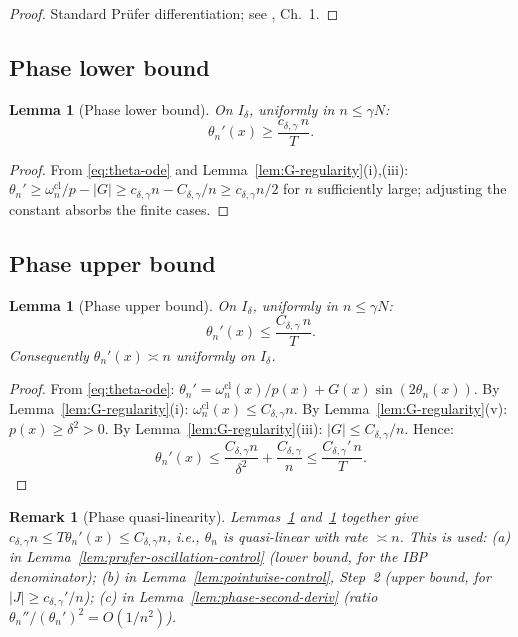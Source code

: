 \documentclass[12pt,a4paper]{amsart}
\newtheorem{lemma}[theorem]{Lemma}
\newtheorem{remark}[theorem]{Remark}
\newcommand{\wncl}{\omega_n^{\mathrm{cl}}}
\begin{document}
\begin{proof}
Standard Pr\"ufer differentiation; see \cite{Levitan}, Ch.~1.
\end{proof}

\subsection{Phase lower bound}

\begin{lemma}[Phase lower bound]\label{lem:phase-lower}
On $I_\delta$, uniformly in $n \le \gamma N$:
\begin{equation}\label{eq:phase-lb}
  \theta_n'(x) \ge \frac{c_{\delta,\gamma}\,n}{T}.
\end{equation}
\end{lemma}

\begin{proof}
From \eqref{eq:theta-ode} and
Lemma~\ref{lem:G-regularity}(i),(iii):
$\theta_n' \ge \wncl/p - |G|
\ge c_{\delta,\gamma}n - C_{\delta,\gamma}/n
\ge c_{\delta,\gamma}n/2$
for $n$ sufficiently large;
adjusting the constant absorbs the finite cases.
\end{proof}

\subsection{Phase upper bound}

\begin{lemma}[Phase upper bound]\label{lem:phase-upper}
On $I_\delta$, uniformly in $n \le \gamma N$:
\begin{equation}\label{eq:phase-ub}
  \theta_n'(x) \le \frac{C_{\delta,\gamma}\,n}{T}.
\end{equation}
Consequently $\theta_n'(x) \asymp n$ uniformly on $I_\delta$.
\end{lemma}

\begin{proof}
From \eqref{eq:theta-ode}:
$\theta_n' = \wncl(x)/p(x) + G(x)\sin(2\theta_n(x))$.
By Lemma~\ref{lem:G-regularity}(i): $\wncl(x) \le C_{\delta,\gamma}n$.
By Lemma~\ref{lem:G-regularity}(v): $p(x) \ge \delta^2 > 0$.
By Lemma~\ref{lem:G-regularity}(iii): $|G| \le C_{\delta,\gamma}/n$.
Hence:
\[
  \theta_n'(x)
  \le \frac{C_{\delta,\gamma}n}{\delta^2}
     + \frac{C_{\delta,\gamma}}{n}
  \le \frac{C_{\delta,\gamma}'\,n}{T}.
\]
\end{proof}

\begin{remark}[Phase quasi-linearity]
Lemmas~\ref{lem:phase-lower} and~\ref{lem:phase-upper} together
give $c_{\delta,\gamma}n \le T\theta_n'(x) \le C_{\delta,\gamma}n$,
i.e., $\theta_n$ is \emph{quasi-linear} with rate $\asymp n$.
This is used:
(a) in Lemma~\ref{lem:prufer-oscillation-control}
    (lower bound, for the IBP denominator);
(b) in Lemma~\ref{lem:pointwise-control}, Step~2
    (upper bound, for $|J| \ge c_{\delta,\gamma}'/n$);
(c) in Lemma~\ref{lem:phase-second-deriv}
    (ratio $\theta_n''/(\theta_n')^2 = O(1/n^2)$).
\end{remark}
\end{document}
